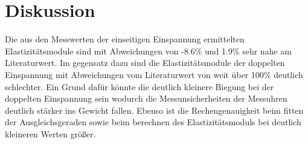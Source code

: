 \section{Diskussion}
\label{sec:Diskussion}
Die aus den Messwerten der einseitigen Einspannung ermittelten Elastizitätsmodule sind mit Abweichungen von -8.6\% und 1.9\% sehr nahe am Literaturwert.
\noindent Im gegensatz dazu sind die Elastizitätsmodule der doppelten Einspannung mit Abweichungen vom Literaturwert von weit über 100\% deutlich schlechter.
\noindent Ein Grund dafür könnte die deutlich kleinere Biegung bei der doppelten Einspannung sein wodurch die Messunsicherheiten der Messuhren deutlich stärker ins Gewicht fallen.
\noindent Ebenso ist die Rechengenauigkeit beim fitten der Ausgleichsgeraden sowie beim berechnen des Elastizitätsmoduls bei deutlich kleineren Werten größer.